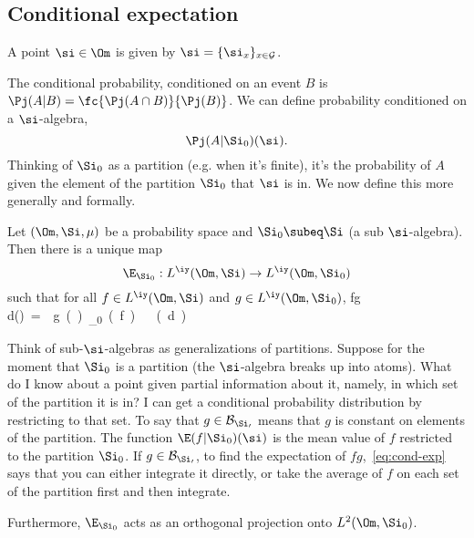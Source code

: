 

\subsection{Conditional expectation}

A point $\si\in \Om$ is given by $\si=\{\si_x\}_{x\in \cal G}$. 

The conditional probability, conditioned on an event $B$ is $\Pj(A|B) = \fc{\Pj(A\cap B)}{\Pj(B)}$. 
We can define probability conditioned on a $\si$-algebra,
\[
\Pj(A|\Si_0)(\si).
\]
Thinking of $\Si_0$ as a partition (e.g. when it's finite),  it's the probability of $A$ given the element of the partition $\Si_0$ that $\si$ is in. We now define this more generally and formally.

\begin{pr}
Let $(\Om,\Si,\mu)$ be a probability space and $\Si_0\subeq \Si$ (a sub $\si$-algebra). Then there is a unique map
\[
\E_{\Si_0}:L^{\iy}(\Om,\Si) \to L^{\iy}(\Om, \Si_0)
\]
such that for all $f\in L^{\iy}(\Om,\Si)$ and $g\in L^{\iy}(\Om,\Si_0)$,
\int fg\,d\mu(\si) = \int g(\si) \E_{\Si_0}(f) \,\mu(d \si).
\eeq
\end{pr}
Think of sub-$\si$-algebras as generalizations of partitions. Suppose for the moment that $\Si_0$ is a partition (the $\si$-algebra breaks up into atoms). What do I know about a point given partial information about it, namely, in which set of the partition it is in? I can get a conditional probability distribution by restricting to that set. To say that $g\in \cal B_{\Si_0}$ means that $g$ is constant on elements of the partition. The function $\E(f|\Si_0)(\si)$ is the mean value of $f$ restricted to the partition $\Si_0$. If $g\in \cal B_{\Si_0}$, to find the expectation of $fg$,~\eqref{eq:cond-exp} says that you can either integrate it directly, or take the average of $f$ on each set of the partition first and then integrate.

Furthermore, $\E_{\Si_0}$ acts as an orthogonal projection onto $L^2(\Om,\Si_0)$. 

